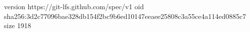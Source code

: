 version https://git-lfs.github.com/spec/v1
oid sha256:3d2c77096bae328db154f2bc9b6ed10147eeaee25808c3a55ce4a114ed0885c7
size 1918
